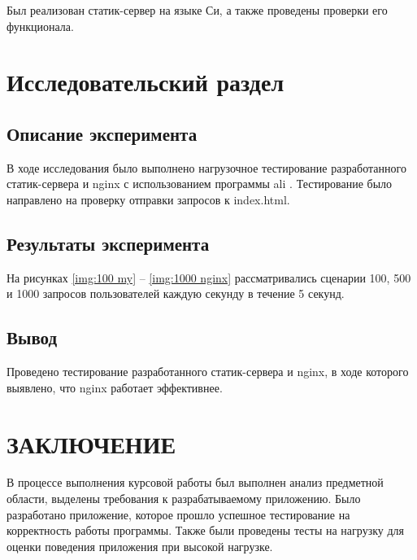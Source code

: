 \documentclass{bmstu}
\begin{document}
Был реализован статик-сервер на языке Си, а также проведены проверки его функционала.

\chapter{Исследовательский раздел}

\section{Описание эксперимента}
В ходе исследования было выполнено нагрузочное тестирование разработанного статик-сервера и nginx с использованием программы 
ali \cite{ali}. Тестирование было направлено на проверку отправки запросов к index.html.

\section{Результаты эксперимента}
На рисунках \ref{img:100 my} -- \ref{img:1000 nginx} рассматривались сценарии 100, 500 и 1000 запросов пользователей каждую секунду в течение 5 секунд.

\clearpage

\section{Вывод}
Проведено тестирование разработанного статик-сервера и nginx, в ходе которого выявлено, что nginx работает эффективнее.


\chapter*{ЗАКЛЮЧЕНИЕ}

В процессе выполнения курсовой работы был выполнен анализ предметной области, 
выделены требования к разрабатываемому приложению. Было разработано приложение, 
которое прошло успешное тестирование на корректность работы программы. Также 
были проведены тесты на нагрузку для оценки поведения приложения при высокой нагрузке.
\end{document}
